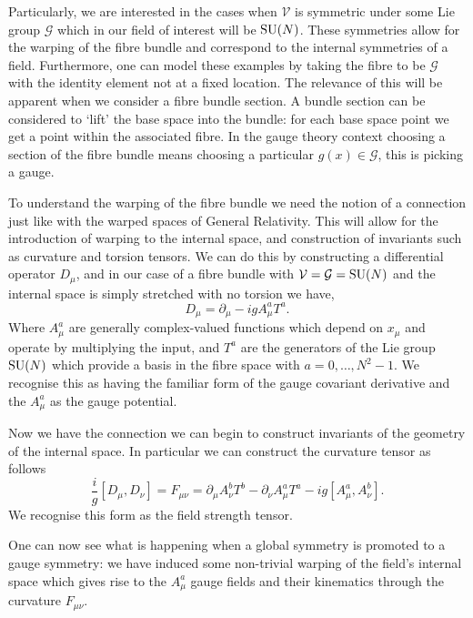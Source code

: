 Particularly, we are interested in the cases when $\mathcal{V}$ is symmetric under some Lie group $\mathcal{G}$ which in our field of interest will be ${\mathrm{SU}(N)}$. 
These symmetries allow for the warping of the fibre bundle and correspond to the internal symmetries of a field. 
Furthermore, one can model these examples by taking the fibre to be $\mathcal{G}$ with the identity element not at a fixed location. 
The relevance of this will be apparent when we consider a fibre bundle section. A bundle section can be considered to `lift' the base space into the bundle: for each base space point we get a point within the associated fibre. In the gauge theory context choosing a section of the fibre bundle means choosing a particular $g(x)\in\mathcal{G}$, this is picking a gauge. 



To understand the warping of the fibre bundle we need the notion of a connection just like with the warped spaces of General Relativity.
This will allow for the introduction of warping to the internal space, and construction of invariants such as curvature and torsion tensors.
We can do this by constructing a differential operator $D_{\mu}$, and in our case of a fibre bundle with $\mathcal{V}=\mathcal{G}={\mathrm{SU}(N)}$ and the internal space is simply stretched with no torsion we have,
\begin{equation}
\label{eq:theory:g_connection}
D_{\mu} = \partial_{\mu} - igA_{\mu}^{a} T^{a}.
\end{equation}
Where $A_{\mu}^{a}$ are generally complex-valued functions which depend on $x_{\mu}$ and operate by multiplying the input, and $T^{a}$ are the generators of the Lie group ${\mathrm{SU}(N)}$ which provide a basis in the fibre space with $a = 0,\ldots,N^{2}-1$.
We recognise this as having the familiar form of the gauge covariant derivative and the $A_{\mu}^{a}$ as the gauge potential. 


Now we have the connection we can begin to construct invariants of the geometry of the internal space. In particular we can construct the curvature tensor as follows
\begin{equation}
    \label{eq:theory:g_curvature}
    \frac{i}{g}[D_{\mu},D_{\nu}] = F_{\mu\nu} = \partial_{\mu} A^{b}_{\nu} T^{b} - \partial_{\nu} A^{a}_{\mu} T^{a} - ig[A^{a}_{\mu}, A^{b}_{\nu}].
\end{equation}
We recognise this form as the field strength tensor.

One can now see what is happening when a global symmetry is promoted to a gauge symmetry: we have induced some non-trivial warping of the field's internal space which gives rise to the $A^{a}_{\mu}$ gauge fields and their kinematics through the curvature $F_{\mu\nu}$.




